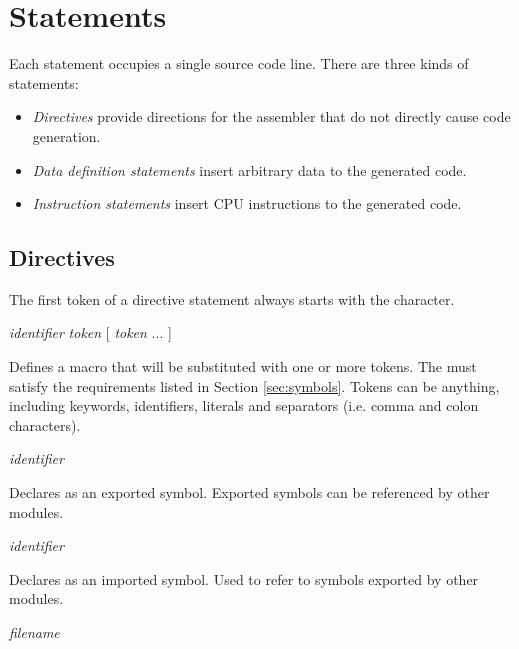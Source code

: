 \documentclass[a4paper,12pt,twoside,extrafontsizes]{memoir}
\begin{document}
\section{Statements}

Each statement occupies a single source code line. There are three kinds of statements:

\begin{itemize}
	\item \emph{Directives} provide directions for the assembler that do not directly cause code generation.
	\item \emph{Data definition statements} insert arbitrary data to the generated code.
	\item \emph{Instruction statements} insert \lxp{} CPU instructions to the generated code.
\end{itemize}

\subsection{Directives}

The first token of a directive statement always starts with the \code{\#} character.

\begin{codepar}
 \emph{identifier} \emph{token} [ \emph{token} ... ]
\end{codepar}

Defines a macro that will be substituted with one or more tokens. The  must satisfy the requirements listed in Section \ref{sec:symbols}. Tokens can be anything, including keywords, identifiers, literals and separators (i.e. comma and colon characters).

\begin{codepar}
 \emph{identifier}
\end{codepar}

Declares  as an exported symbol. Exported symbols can be referenced by other modules.

\begin{codepar}
 \emph{identifier}
\end{codepar}

Declares  as an imported symbol. Used to refer to symbols exported by other modules.

\begin{codepar}
 \emph{filename}
\end{codepar}
\end{document}
